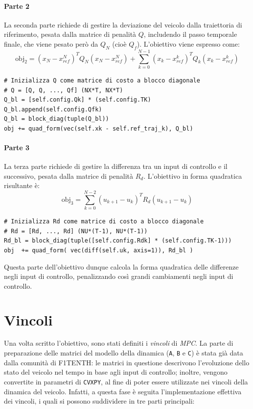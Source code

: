 \paragraph{Parte 2} La seconda parte richiede di gestire 
la deviazione del veicolo dalla traiettoria di riferimento, pesata dalla 
matrice di penalità $Q$, includendo il passo temporale finale, che viene pesato però 
da $Q_N$ (cioè $Q_f$). L'obiettivo viene espresso come: 
\[
\text{obj}_2 = (x_N - x_{ref}^N)^T Q_N (x_N - x_{ref}^N) + \sum_{k=0}^{N-1}{(x_k - x_{ref}^k)^T Q_k (x_k - x_{ref}^k)}
\]
\begin{lstlisting}[language=PythonPlus]
# Inizializza Q come matrice di costo a blocco diagonale
# Q = [Q, Q, ..., Qf] (NX*T, NX*T)
Q_bl = [self.config.Qk] * (self.config.TK)
Q_bl.append(self.config.Qfk)
Q_bl = block_diag(tuple(Q_bl))
obj += quad_form(vec(self.xk - self.ref_traj_k), Q_bl)
\end{lstlisting}
\paragraph{Parte 3} La terza parte richiede di gestire 
la differenza tra un input di controllo e il successivo, pesata dalla 
matrice di penalità $R_d$. L'obiettivo in forma quadratica risultante è:
\[
\text{obj}_3 = \sum_{k=0}^{N-2}{(u_{k+1}-u_{k})^T R_d (u_{k+1}-u_{k})}
\]
\begin{lstlisting}[language=PythonPlus]
# Inizializza Rd come matrice di costo a blocco diagonale
# Rd = [Rd, ..., Rd] (NU*(T-1), NU*(T-1))
Rd_bl = block_diag(tuple([self.config.Rdk] * (self.config.TK-1)))
obj  += quad_form( vec(diff(self.uk, axis=1)), Rd_bl )
\end{lstlisting}
Questa parte dell'obiettivo dunque calcola la forma quadratica delle differenze negli input di 
controllo, penalizzando così grandi cambiamenti negli input di controllo.

\section{Vincoli}
Una volta scritto l'obiettivo, sono stati definiti i \textit{vincoli} di \textit{MPC}.
La parte di preparazione delle matrici del modello della dinamica 
(\verb|A|, \verb|B| e \verb|C|) è stata già data dalla comunità di F1TENTH: le matrici in 
questione descrivono l'evoluzione dello stato del veicolo nel tempo in base agli input di 
controllo; inoltre, vengono convertite in parametri di \verb|CVXPY|, al fine di poter essere 
utilizzate nei vincoli della dinamica del veicolo.
Infatti, a questa fase è seguita l'implementazione effettiva dei vincoli, i quali si possono suddividere in tre parti principali: 
